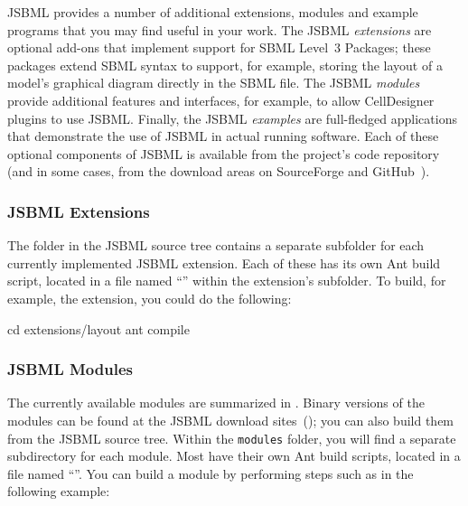 JSBML provides a number of additional extensions, modules and example
programs that you may find useful in your work.  The JSBML \emph{extensions} are
optional add-ons that implement support for SBML Level~3 Packages; these
packages extend SBML syntax to support, for example, storing the layout of
a model's graphical diagram directly in the SBML file.  The JSBML
\emph{modules} provide additional features and interfaces, for example, to
allow CellDesigner~\cite{Funahashi2003} plugins to use JSBML.  Finally, the
JSBML \emph{examples} are full-fledged applications that demonstrate the
use of JSBML in actual running software.  Each of these optional components
of JSBML is available from the project's code repository (and in some
cases, from the download areas on SourceForge and
GitHub~\cite{JSBMLdownloadSF, JSBMLdownloadGitHub}).


\subsubsection{JSBML Extensions}

The  folder in the JSBML source tree contains a separate
subfolder for each currently implemented JSBML extension.
Each of these has its own Ant build script, located in a file
named ``'' within the extension's
subfolder.  To build, for example, the  extension, you could
do the following:

\begin{example}[style=bash, title={Compiling the JSBML ``\code{layout}'' extension.}]
cd extensions/layout
ant compile
\end{example}

\vspace*{-2ex}

\subsubsection{JSBML Modules}
\label{sec:jsbml-modules}

The currently available modules are summarized in
.  Binary versions of the modules can be
found at the JSBML download sites~(\cite{JSBMLdownloadSF,
  JSBMLdownloadGitHub}); you can also build them from the JSBML
source tree.  Within the \texttt{modules} folder, you will find a
separate subdirectory for each module.  Most have their own Ant build
scripts, located in a file named ``''.  You can
build a module by performing steps such as in the following
example:

